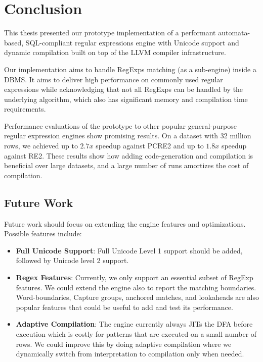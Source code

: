 \chapter{Conclusion}\label{chapter:conclusion}
This thesis presented our prototype implementation of a performant automata-based, SQL-compliant regular expressions engine with Unicode support and dynamic compilation built on top of the LLVM compiler infrastructure.

Our implementation aims to handle RegExps matching (as a sub-engine) inside a DBMS. It aims to deliver high performance on commonly used regular expressions while acknowledging that not all RegExps can be handled by the underlying algorithm, which also has significant memory and compilation time requirements.

Performance evaluations of the prototype to other popular general-purpose regular expression engines show promising results. On a dataset with 32 million rows, we achieved up to $2.7x$ speedup against PCRE2 and up to $1.8x$ speedup against RE2. These results show how adding code-generation and compilation is beneficial over large datasets, and a large number of runs amortizes the cost of compilation.

\section{Future Work}\label{futurework}

Future work should focus on extending the engine features and optimizations. Possible features include:
\begin{itemize}
    \item \textbf{Full Unicode Support}: Full Unicode Level 1 support should be added, followed by Unicode level 2 support.
    \item \textbf{Regex Features}: Currently, we only support an essential subset of RegExp features. We could extend the engine also to report the matching boundaries. Word-boundaries, Capture groups, anchored matches, and lookaheads are also popular features that could be useful to add and test its performance.  
    \item \textbf{Adaptive Compilation}: The engine currently always JITs the DFA before execution which is costly for patterns that are executed on a small number of rows. We could improve this by doing adaptive compilation where we dynamically switch from interpretation to compilation only when needed.
\end{itemize}

